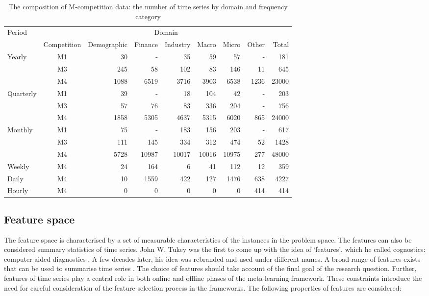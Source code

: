\documentclass{monashthesis}
\begin{document}
\begin{table}[!h]
\centering\scriptsize\tabcolsep=0.12cm
\caption{The composition of M-competition data: the number of time series by domain and frequency category}
\label{mcomp}
{\color{black}\begin{tabular}{l|c|rrrrrr|r|}
\hline
\multirow{2}{*}{Period} & \multicolumn{8}{c|}{Domain} \\ \cline{2-9} 
                  &Competition &Demographic  & Finance  & Industry  & Macro  & Micro & Other &  Total\\ \hline
\multirow{3}{*}{Yearly}& M1 & 30  & -  & 35  & 59 & 57  & - & 181 \\ 
                  & M3  & 245  &  58 &  102 & 83 &146  &  11&645  \\ 
                  & M4 &  1088 &  6519 &  3716 &  3903& 6538 &1236  & 23000 \\ \hline
\multirow{3}{*}{Quarterly}& M1 &  39 &  - & 18  & 104 & 42 &  -&  203\\ 
                 & M3  & 57  &  76 &  83 &  336&  204&  -&  756\\ 
                 & M4 & 1858  & 5305  & 4637  &5315  &  6020& 865 & 24000 \\ \hline
\multirow{3}{*}{Monthly}& M1 &  75 & -  & 183  & 156 & 203 & - &  617\\ 
                 & M3 & 111  & 145  & 334   & 312 & 474 & 52  & 1428 \\  
                 & M4 & 5728  & 10987  & 10017  & 10016 & 10975 & 277 & 48000 \\ \hline
Weekly           & M4 &  24 &  164 &  6 & 41 & 112 & 12 & 359 \\ 
Daily            & M4 & 10  & 1559  &  422 & 127 & 1476 & 638 & 4227 \\ 
Hourly           & M4 &  0 &0   & 0  &  0&  0&  414&  414\\ \hline
\end{tabular}}
\end{table}

\hypertarget{feature-space}{%
\subsection{Feature space}\label{feature-space}}

The feature space is characterised by a set of measurable characteristics of the instances in the problem space. The features can also be considered summary statistics of time series. John W. Tukey was the first to come up with the idea of `features', which he called cognostics: computer aided diagnostics \autocite{tukey1988computer}. A few decades later, his idea was rebranded and used under different names. A broad range of features exists that can be used to summarise time series \autocite{fulcher2014highly}. The choice of features should take account of the final goal of the research question. Further, features of time series play a central role in both online and offline phases of the meta-learning framework. These constraints introduce the need for careful consideration of the feature selection process in the frameworks. The following properties of features are considered:
\end{document}
